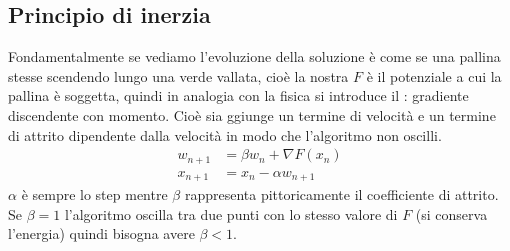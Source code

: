 \documentclass[10pt,a4paper]{article}
\begin{document}
\subsection{Principio di inerzia}
Fondamentalmente se vediamo l'evoluzione della soluzione è come se una pallina stesse scendendo lungo una verde vallata, cioè la nostra $F$ è il potenziale a cui la pallina è soggetta, quindi in analogia con la fisica si introduce il : gradiente discendente con momento. Cioè sia ggiunge un termine di velocità e un termine di attrito dipendente dalla velocità in modo che l'algoritmo non oscilli.
\begin{align}
w_{n+1} &= \beta w_n + \nabla F(x_n) \\
x_{n+1} &= x_n - \alpha w_{n+1}
\end{align}
$\alpha$ è sempre lo step mentre $\beta$ rappresenta pittoricamente il coefficiente di attrito. Se $\beta=1$ l'algoritmo oscilla tra due punti con lo stesso valore di $F$ (si conserva l'energia) quindi bisogna avere $\beta<1$.
\end{document}
